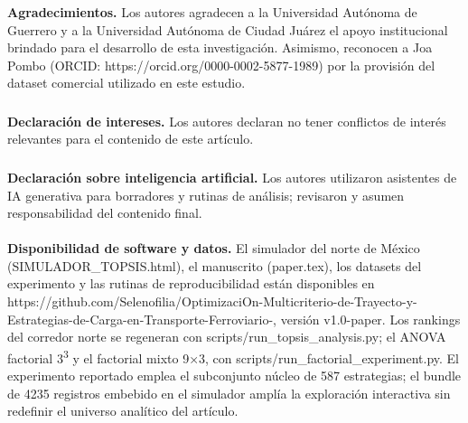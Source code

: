 \documentclass[runningheads]{llncs}
\begin{document}
\subsubsection*{}
\textbf{Agradecimientos. }Los autores agradecen a la Universidad Autónoma de Guerrero y a la Universidad Autónoma de Ciudad Juárez el apoyo institucional brindado para el desarrollo de esta investigación. Asimismo, reconocen a Joa Pombo (ORCID: https://orcid.org/0000-0002-5877-1989) por la provisión del dataset comercial utilizado en este estudio.

\subsubsection*{}
\textbf{Declaración de intereses. }Los autores declaran no tener conflictos de interés relevantes para el contenido de este artículo.

\subsubsection*{}
\textbf{Declaración sobre inteligencia artificial. }Los autores utilizaron asistentes de IA generativa para borradores y rutinas de análisis; revisaron y asumen responsabilidad del contenido final.

\paragraph{}
\textbf{Disponibilidad de software y datos. }El simulador del norte de México (SIMULADOR\_TOPSIS.html), el manuscrito (paper.tex), los datasets del experimento y las rutinas de reproducibilidad están disponibles en https://github.com/Selenofilia/OptimizaciOn-Multicriterio-de-Trayecto-y-Estrategias-de-Carga-en-Transporte-Ferroviario-, versión v1.0-paper. Los rankings del corredor norte se regeneran con scripts/run\_topsis\_analysis.py; el ANOVA factorial 3\textsuperscript{3} y el factorial mixto 9×3, con scripts/run\_factorial\_experiment.py. El experimento reportado emplea el subconjunto núcleo de 587 estrategias; el bundle de 4235 registros embebido en el simulador amplía la exploración interactiva sin redefinir el universo analítico del artículo.
\end{document}
